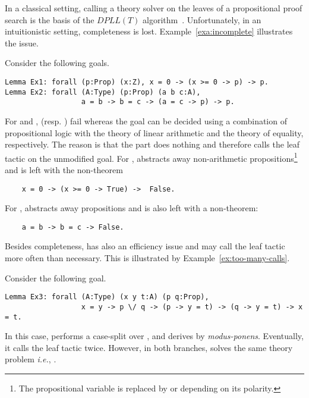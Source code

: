 \documentclass[utf8,a4paper,UKenglish,cleveref, autoref, thm-restate]{lipics-v2019}
\begin{document}
In a classical setting, calling a theory solver on the leaves of a
propositional proof search is the basis of the $\mathit{DPLL(T)}$
algorithm~\cite{GanzingerHNOT04}.  Unfortunately, in an intuitionistic
setting, completeness is lost. Example~\ref{exa:incomplete}
illustrates the issue.
\begin{example}
  \label{exa:incomplete}
  Consider the following goals.
  \begin{verbatim}
Lemma Ex1: forall (p:Prop) (x:Z), x = 0 -> (x >= 0 -> p) -> p.
Lemma Ex2: forall (A:Type) (p:Prop) (a b c:A),
                  a = b -> b = c -> (a = c -> p) -> p.
\end{verbatim}
  For  and ,  (resp. ) fail whereas
  the goal can be decided using a combination of
  propositional logic with the theory of linear arithmetic and
  the theory of equality, respectively.
  The reason is that the  part does nothing and
  therefore calls the leaf tactic on the unmodified goal.  For
  ,  abstracts away non-arithmetic
  propositions\footnote{The propositional variable  is replaced by
     or  depending on its polarity.} and is
  left with the non-theorem
  \begin{verbatim}
    x = 0 -> (x >= 0 -> True) ->  False.
  \end{verbatim}
  For ,  abstracts away
  propositions and is also left with a non-theorem:
  \begin{verbatim}
    a = b -> b = c -> False.
  \end{verbatim}
\end{example}
Besides completeness,  has also an efficiency issue and may call the leaf tactic 
more often than necessary. %
This is illustrated by Example~\ref{ex:too-many-calls}.
\begin{example}
  \label{ex:too-many-calls}
  Consider the following goal.
  \begin{verbatim}
Lemma Ex3: forall (A:Type) (x y t:A) (p q:Prop),
                  x = y -> p \/ q -> (p -> y = t) -> (q -> y = t) -> x = t.
  \end{verbatim}
  In this case,  performs a case-split
  over , and derives  by
  \emph{modus-ponens}. Eventually, it calls the leaf tactic
   twice.  However, in both branches,
   solves the same theory problem \emph{i.e.},
  .
\end{example}
\end{document}

